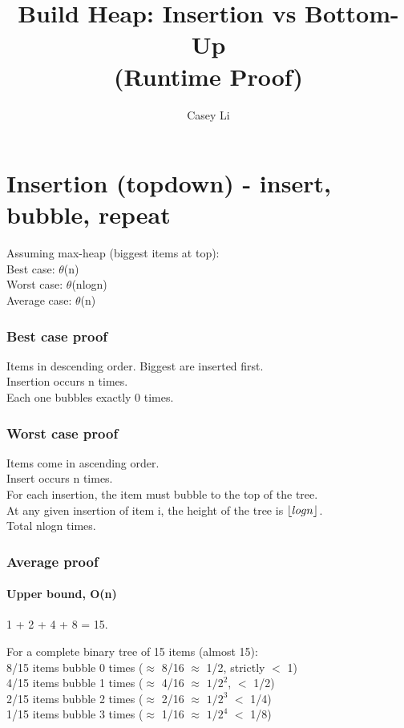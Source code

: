 \documentclass{article}
\title{Build Heap: Insertion vs Bottom-Up\\(Runtime Proof)}
\author{Casey Li}
\DeclarePairedDelimiter{\floor}{\lfloor}{\rfloor}
\begin{document}
\maketitle

\part*{Insertion (topdown) - insert, bubble, repeat}
Assuming max-heap (biggest items at top): \\

Best case: $\theta$(n) \\
Worst case: $\theta$(nlogn) \\
Average case: $\theta$(n)\\

\section*{Best case proof}
Items in descending order. Biggest are inserted first.\\
Insertion occurs n times.\\
Each one bubbles exactly 0 times.

\section*{Worst case proof}
Items come in ascending order.\\
Insert occurs n times.\\
For each insertion, the item must bubble to the top of the tree.\\
At any given insertion of item i, the height of the tree is $\floor{logn}$.\\
Total nlogn times.

\section*{Average proof}
\subsection*{Upper bound, O(n)}
1 + 2 + 4 + 8 = 15.

For a complete binary tree of 15 items (almost 15): \\

8/15 items bubble 0 times ($\approx$ 8/16 $\approx$ 1/2, strictly $<$ 1) \\
4/15 items bubble 1 times ($\approx$ 4/16 $\approx$ $1/2^2$, $<$ 1/2) \\
2/15 items bubble 2 times ($\approx$ 2/16 $\approx$ $1/2^3$ $<$ 1/4)\\
1/15 items bubble 3 times ($\approx$ 1/16 $\approx$ $1/2^4$ $<$ 1/8)\\
\end{document}
